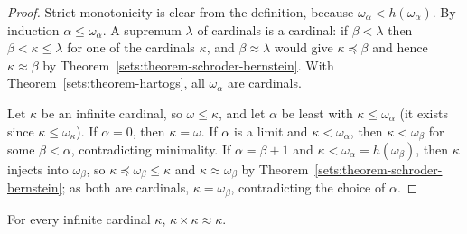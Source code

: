 \begin{proof}
Strict monotonicity is clear from the definition, because
$\omega_\alpha < h(\omega_\alpha)$. By induction $\alpha \leq \omega_\alpha$. A
supremum $\lambda$ of cardinals is a cardinal: if $\beta < \lambda$ then
$\beta < \kappa \leq \lambda$ for one of the cardinals $\kappa$, and
$\beta \approx \lambda$ would give $\kappa \preceq \beta$ and hence
$\kappa \approx \beta$ by Theorem~\ref{sets:theorem-schroder-bernstein}. With
Theorem~\ref{sets:theorem-hartogs}, all $\omega_\alpha$ are cardinals.

Let $\kappa$ be an infinite cardinal, so $\omega \leq \kappa$, and let $\alpha$ be
least with $\kappa \leq \omega_\alpha$ (it exists since
$\kappa \leq \omega_\kappa$). If $\alpha = 0$, then $\kappa = \omega$. If
$\alpha$ is a limit and $\kappa < \omega_\alpha$, then $\kappa < \omega_\beta$
for some $\beta < \alpha$, contradicting minimality. If $\alpha = \beta + 1$
and $\kappa < \omega_\alpha = h(\omega_\beta)$, then $\kappa$ injects into
$\omega_\beta$, so $\kappa \preceq \omega_\beta \leq \kappa$ and $\kappa \approx \omega_\beta$
by Theorem~\ref{sets:theorem-schroder-bernstein}; as both are cardinals,
$\kappa = \omega_\beta$, contradicting the choice of $\alpha$.
\end{proof}

\begin{theorem}[Hessenberg]\label{sets:theorem-hessenberg}
For every infinite cardinal $\kappa$, $\kappa \times \kappa \approx \kappa$.
\end{theorem}

